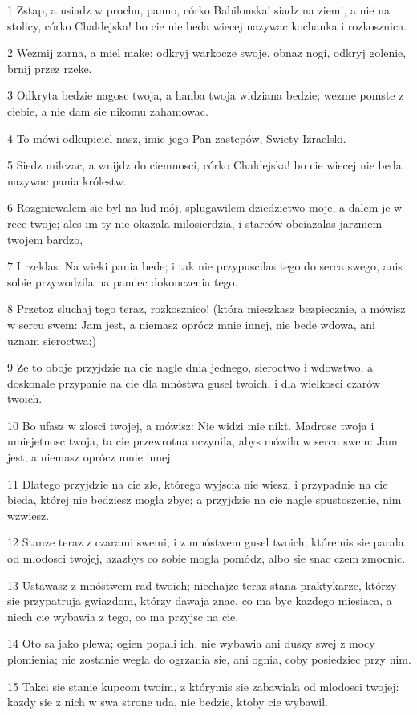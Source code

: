 \par 1 Zstap, a usiadz w prochu, panno, córko Babilonska! siadz na ziemi, a nie na stolicy, córko Chaldejska! bo cie nie beda wiecej nazywac kochanka i rozkosznica.
\par 2 Wezmij zarna, a miel make; odkryj warkocze swoje, obnaz nogi, odkryj golenie, brnij przez rzeke.
\par 3 Odkryta bedzie nagosc twoja, a hanba twoja widziana bedzie; wezme pomste z ciebie, a nie dam sie nikomu zahamowac.
\par 4 To mówi odkupiciel nasz, imie jego Pan zastepów, Swiety Izraelski.
\par 5 Siedz milczac, a wnijdz do ciemnosci, córko Chaldejska! bo cie wiecej nie beda nazywac pania królestw.
\par 6 Rozgniewalem sie byl na lud mój, splugawilem dziedzictwo moje, a dalem je w rece twoje; ales im ty nie okazala milosierdzia, i starców obciazalas jarzmem twojem bardzo,
\par 7 I rzeklas: Na wieki pania bede; i tak nie przypuscilas tego do serca swego, anis sobie przywodzila na pamiec dokonczenia tego.
\par 8 Przetoz sluchaj tego teraz, rozkosznico! (która mieszkasz bezpiecznie, a mówisz w sercu swem: Jam jest, a niemasz oprócz mnie innej, nie bede wdowa, ani uznam sieroctwa;)
\par 9 Ze to oboje przyjdzie na cie nagle dnia jednego, sieroctwo i wdowstwo, a doskonale przypanie na cie dla mnóstwa gusel twoich, i dla wielkosci czarów twoich.
\par 10 Bo ufasz w zlosci twojej, a mówisz: Nie widzi mie nikt. Madrosc twoja i umiejetnosc twoja, ta cie przewrotna uczynila, abys mówila w sercu swem: Jam jest, a niemasz oprócz mnie innej.
\par 11 Dlatego przyjdzie na cie zle, którego wyjscia nie wiesz, i przypadnie na cie bieda, której nie bedziesz mogla zbyc; a przyjdzie na cie nagle spustoszenie, nim wzwiesz.
\par 12 Stanze teraz z czarami swemi, i z mnóstwem gusel twoich, któremis sie parala od mlodosci twojej, azazbys co sobie mogla pomódz, albo sie snac czem zmocnic.
\par 13 Ustawasz z mnóstwem rad twoich; niechajze teraz stana praktykarze, którzy sie przypatruja gwiazdom, którzy dawaja znac, co ma byc kazdego miesiaca, a niech cie wybawia z tego, co ma przyjsc na cie.
\par 14 Oto sa jako plewa; ogien popali ich, nie wybawia ani duszy swej z mocy plomienia; nie zostanie wegla do ogrzania sie, ani ognia, coby posiedziec przy nim.
\par 15 Takci sie stanie kupcom twoim, z którymis sie zabawiala od mlodosci twojej: kazdy sie z nich w swa strone uda, nie bedzie, ktoby cie wybawil.

